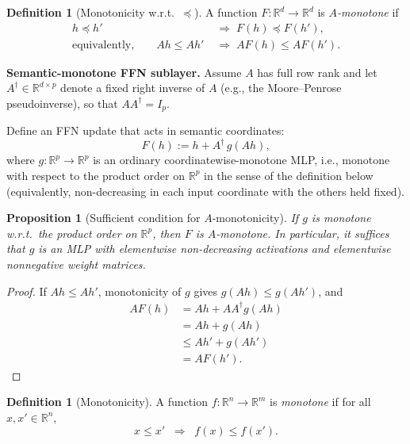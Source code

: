 \documentclass{article}
\theoremstyle{plain}
\newtheorem{proposition}[theorem]{Proposition}
\theoremstyle{definition}
\newtheorem{definition}[theorem]{Definition}
\theoremstyle{remark}
\begin{document}
\begin{definition}[Monotonicity w.r.t.\ $\preceq$]
A function $F:\mathbb{R}^d \to \mathbb{R}^d$ is \emph{$A$-monotone} if
\begin{align*}
h \preceq h' 
&\;\Rightarrow\; F(h) \preceq F(h'), \\
\text{equivalently,}\qquad
Ah \le Ah' 
&\;\Rightarrow\; A F(h) \le A F(h').
\end{align*}

\end{definition}

\textbf{Semantic-monotone FFN sublayer.}
Assume $A$ has full row rank and let $A^\dagger \in \mathbb{R}^{d \times p}$ denote a fixed
right inverse of $A$ (e.g., the Moore--Penrose pseudoinverse), so that $A A^\dagger = I_p$.

Define an FFN update that acts in semantic coordinates:
\[
F(h) := h + A^\dagger\, g(Ah),
\]
where $g:\mathbb{R}^p \to \mathbb{R}^p$ is an ordinary coordinatewise-monotone MLP, i.e., monotone with respect to the product order on $\mathbb{R}^p$ in the sense of the definition below (equivalently, non-decreasing in each input coordinate with the others held fixed).

\begin{proposition}[Sufficient condition for $A$-monotonicity]
If $g$ is monotone w.r.t.\ the product order on $\mathbb{R}^p$, then $F$ is $A$-monotone.
In particular, it suffices that $g$ is an MLP with elementwise non-decreasing activations
and elementwise nonnegative weight matrices.
\end{proposition}

\begin{proof}
If $Ah \le Ah'$, monotonicity of $g$ gives $g(Ah) \le g(Ah')$, and
\begin{align*}
A F(h)
&= Ah + A A^\dagger g(Ah) \\
&= Ah + g(Ah) \\
&\le Ah' + g(Ah') \\
&= A F(h').
\end{align*}

\end{proof}


\begin{definition}[Monotonicity]
A function $f : \mathbb{R}^n \to \mathbb{R}^m$ is \emph{monotone} if for all $x,x' \in \mathbb{R}^n$,
\[
x \le x' \;\; \Rightarrow \;\; f(x) \le f(x').
\]
\end{definition}
\end{document}
